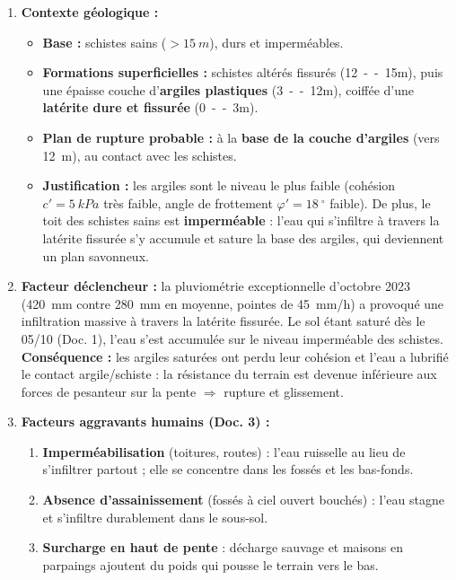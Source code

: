 \documentclass[11pt]{article}
\providecommand{\degree}{^{\circ}}
\begin{document}
\begin{corrige}
\tcblower
\begin{enumerate}
\item \textbf{Contexte géologique :}
      \begin{itemize}
      \item \textbf{Base :} schistes sains ($> \SI{15}{m}$), durs et imperméables.
      \item \textbf{Formations superficielles :} schistes altérés fissurés (\SI{12}{--15}{m}), puis une épaisse couche d'\textbf{argiles plastiques} (\SI{3}{--12}{m}), coiffée d'une \textbf{latérite dure et fissurée} (\SI{0}{--3}{m}).
      \item \textbf{Plan de rupture probable :} à la \textbf{base de la couche d'argiles} (vers \SI{12}{m}), au contact avec les schistes.
      \item \textbf{Justification :} les argiles sont le niveau le plus faible (cohésion $c' = \SI{5}{kPa}$ très faible, angle de frottement $\varphi' = \SI{18}{\degree}$ faible). De plus, le toit des schistes sains est \textbf{imperméable} : l'eau qui s'infiltre à travers la latérite fissurée s'y accumule et sature la base des argiles, qui deviennent un plan savonneux.
      \end{itemize}
\item \textbf{Facteur déclencheur :} la pluviométrie exceptionnelle d'octobre 2023 (\SI{420}{mm} contre \SI{280}{mm} en moyenne, pointes de \SI{45}{mm/h}) a provoqué une infiltration massive à travers la latérite fissurée. Le sol étant saturé dès le 05/10 (Doc. 1), l'eau s'est accumulée sur le niveau imperméable des schistes. \textbf{Conséquence :} les argiles saturées ont perdu leur cohésion et l'eau a lubrifié le contact argile/schiste : la résistance du terrain est devenue inférieure aux forces de pesanteur sur la pente $\Rightarrow$ rupture et glissement.
\item \textbf{Facteurs aggravants humains (Doc. 3) :}
      \begin{enumerate}
      \item \textbf{Imperméabilisation} (toitures, routes) : l'eau ruisselle au lieu de s'infiltrer partout ; elle se concentre dans les fossés et les bas-fonds.
      \item \textbf{Absence d'assainissement} (fossés à ciel ouvert bouchés) : l'eau stagne et s'infiltre durablement dans le sous-sol.
      \item \textbf{Surcharge en haut de pente} : décharge sauvage et maisons en parpaings ajoutent du poids qui pousse le terrain vers le bas.

\end{enumerate}
\end{enumerate}
\end{corrige}
\end{document}

